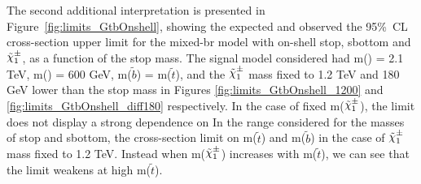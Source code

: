 The second additional interpretation is presented in 
Figure~\ref{fig:limits_GtbOnshell}, showing the expected and observed the 95\%~CL cross-section upper limit for the mixed-\gls{br}
 model with on-shell stop, sbottom and $\chinoonepm$, as a function of the stop mass.
The signal model considered had m(\gluino) = 2.1 TeV, m(\ninoone) = 600 GeV, m($\tilde{b}$) = m($\tilde{t}$), 
and the $\chinoonepm$ mass fixed to 1.2 TeV and 
180 GeV lower than the stop mass in Figures \ref{fig:limits_GtbOnshell_1200}  and \ref{fig:limits_GtbOnshell_diff180} respectively.
In the case of fixed m($\chinoonepm$), the limit does not display a strong dependence on 
In the range considered for the masses of stop and sbottom, the cross-section limit on m($\tilde{t}$) and m($\tilde{b}$) in 
the case of  $\chinoonepm$ mass fixed to 1.2 TeV. 
Instead when m($\chinoonepm$) increases with m($\tilde{t}$),
we can see that the limit weakens at high m($\tilde{t}$).

